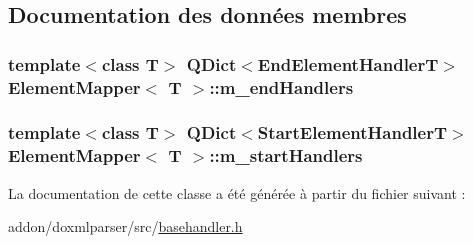 \subsection{Documentation des données membres}
\hypertarget{class_element_mapper_acc10714885fecc41c06efd87a3277b71}{}
\subsubsection[{m\+\_\+end\+Handlers}]{\setlength{\rightskip}{0pt plus 5cm}template$<$class T$>$ Q\+Dict$<${\bf End\+Element\+Handler\+T}$>$ {\bf Element\+Mapper}$<$ T $>$\+::m\+\_\+end\+Handlers\hspace{0.3cm}{\ttfamily [protected]}}\label{class_element_mapper_acc10714885fecc41c06efd87a3277b71}
\hypertarget{class_element_mapper_ac65b2d91a218457be0013a5b34ce6b60}{}
\subsubsection[{m\+\_\+start\+Handlers}]{\setlength{\rightskip}{0pt plus 5cm}template$<$class T$>$ Q\+Dict$<${\bf Start\+Element\+Handler\+T}$>$ {\bf Element\+Mapper}$<$ T $>$\+::m\+\_\+start\+Handlers\hspace{0.3cm}{\ttfamily [protected]}}\label{class_element_mapper_ac65b2d91a218457be0013a5b34ce6b60}


La documentation de cette classe a été générée à partir du fichier suivant \+:\begin{DoxyCompactItemize}
\item 
addon/doxmlparser/src/\hyperlink{basehandler_8h}{basehandler.\+h}\end{DoxyCompactItemize}

